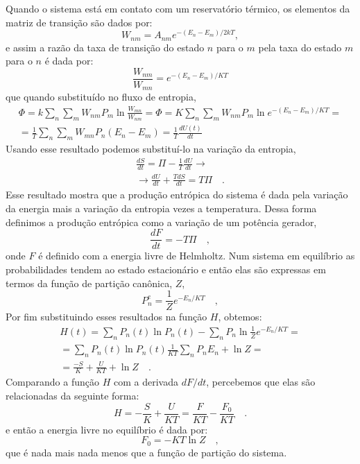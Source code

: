 \documentclass[12pt]{article}
\begin{document}
Quando o sistema está em contato com um reservatório térmico, os elementos da matriz de transição são dados por:
\begin{equation}
W_{nm} = A_{nm}e^{-(E_n-E_m)/2kT}, 
\end{equation}
e assim a razão da taxa de transição do estado $n$  para o $m$ pela taxa do estado $m$ para o $n$ é dada por:
\begin{equation}
\frac{W_{nm}}{W_{mn}} = e^{-(E_n - E_m)/KT}
\end{equation}
que quando substituído no fluxo de entropia,
\begin{equation}
\begin{split}
\Phi = k \sum_n\sum_m W_{nm}P_m\ln \frac{W_{mn}}{W_{nm}} = \Phi = K \sum_n\sum_m W_{nm}P_m\ln e^{-(E_n - E_m)/KT} = \\
= \frac{1}{T} \sum_n\sum_m W_{mn}P_n(E_n - E_m) = \frac{1}{T}\frac{dU(t)}{dt}
\end{split}
\end{equation}
Usando esse resultado podemos substituí-lo na variação da entropia,
\begin{equation}
\begin{split}
\frac{dS}{dt} = \Pi - \frac{1}{T}\frac{dU}{dt}\rightarrow\\
\rightarrow \frac{dU}{dt} + \frac{TdS}{dt} = T\Pi \quad.
\end{split}
\end{equation}
Esse resultado mostra que a produção entrópica do sistema é dada pela variação da energia mais a variação da entropia vezes a temperatura. 
Dessa forma definimos a produção entrópica como a variação de um potência gerador,
\begin{equation}
\frac{dF}{dt} = -T\Pi \quad,
\end{equation}
onde $F$ é definido com a energia livre de Helmholtz. Num sistema em equilíbrio as probabilidades tendem ao estado estacionário e então elas são expressas em termos da função de partição canônica, $Z$,
\begin{equation}
P_n^e = \frac{1}{Z} e^{-E_n /KT} \quad,
\end{equation}
Por fim substituindo esses resultados na função $H$, obtemos:
\begin{equation}
\begin{split}
H(t) = \sum_n P_n(t)\ln P_n(t) - \sum_n P_n \ln \frac{1}{Z} e^{-E_n /KT} =\\
= \sum_n P_n(t)\ln P_n(t) \frac{1}{KT}\sum_n P_n E_n +  \ln Z = \\
= \frac{-S}{K} + \frac{U}{KT} + \ln Z \quad. 
\end{split}
\end{equation}
Comparando a função $H$ com a derivada $dF/dt$, percebemos que elas são relacionadas da seguinte forma:
\begin{equation}
H = -\frac{S}{K} + \frac{U}{KT} = \frac{F}{KT} -\frac{F_0}{KT} \quad.
\end{equation}
e então a energia livre no equilíbrio é dada por:
\begin{equation}
F_0 = -KT \ln Z \quad,
\end{equation}
que é nada mais nada menos que a função de partição do sistema. 
\end{document}
